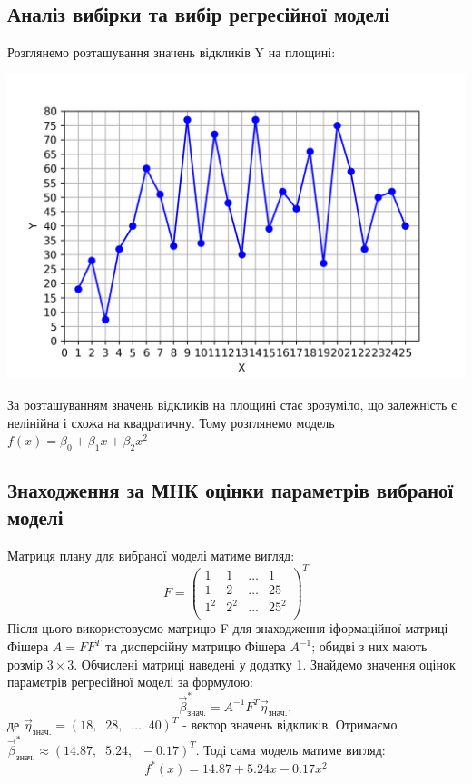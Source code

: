 \documentclass{article}
\begin{document}
    \subsection{Аналіз вибірки та вибір регресійної моделі}
      Розглянемо розташування значень відкликів Y на площині:
      \begin{center}
        \includegraphics[scale=0.8]{task1_data}
      \end{center}
      За розташуванням значень відкликів на площині стає зрозуміло, 
      що залежність є нелінійна і схожа на квадратичну.
      Тому розглянемо модель $f(x) = \beta_0 + \beta_1 x + \beta_2 x^2$
    \subsection{Знаходження за МНК оцінки параметрів вибраної моделі}
      Матриця плану для вибраної моделі матиме вигляд:
      \begin{equation}\label{eq:}
          F = 
          \begin{pmatrix}
              1 & 1 & \dots & 1 \\
              1 & 2 & \dots & 25 \\
              1^2 & 2^2 & \dots & 25^2 \\
          \end{pmatrix}^T
      \end{equation}
      Після цього використовуємо матрицю F для знаходження іформаційної матриці 
      Фішера $A = FF^T $ та дисперсійну матрицю Фішера $A^{-1}$; обидві з них мають 
      розмір $3 \times 3$.
      Обчислені матриці наведені у додатку 1.
      \newpage
      Знайдемо значення оцінок параметрів регресійної моделі за формулою:
      \begin{equation}
        \vec{\beta}^*_{\text{знач.}} = A^{-1}F^T\vec{\eta}_\text{знач.},
      \end{equation}
      де $\vec{\eta}_\text{знач.} = (18, \;\; 28, \;\; \dots \;\; 40)^T$ - вектор значень 
      відкликів.
      Отримаємо $\vec{\beta}^*_{\text{знач.}} \approx (14.87, \;\; 5.24, \;\; -0.17)^T$.
      Тоді сама модель матиме вигляд:
      \begin{equation}
        f^*(x) = 14.87 + 5.24 x - 0.17 x^2
      \end{equation}
\end{document}
